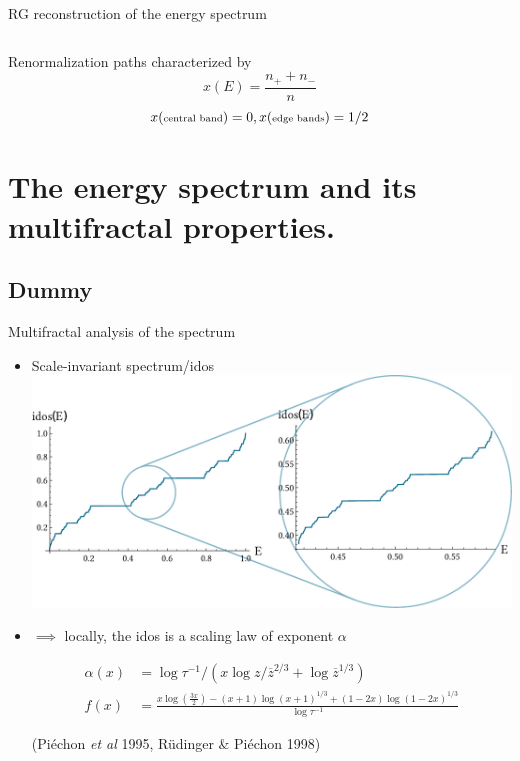\documentclass[xcolor=x11names,compress,professionalfonts]{beamer}
\renewcommand{\(}{\begin{columns}}
\renewcommand{\)}{\end{columns}}
\newcommand{\<}[1]{\begin{column}{#1}}
\renewcommand{\>}{\end{column}}
\newcommand{\zb}{\ensuremath{\overline{z}}}
\begin{document}
\begin{frame}{RG reconstruction of the energy spectrum}
\begin{columns}
\begin{column}{6cm}
	\end{column}
	\end{columns}
	Renormalization paths characterized by
	\[ 
		x(E) = \frac{n_+ + n_-}{n} 
	\]
	\[ 
		x(\text{\scriptsize{central band}}) = 0, x(\text{\scriptsize{edge bands}}) = 1/2
	\]
\end{frame}

\section{The energy spectrum and its multifractal properties.}
\subsection{Dummy}

\begin{frame}{Multifractal analysis of the spectrum}

	\begin{itemize}
		\item Scale-invariant spectrum/idos
		\includegraphics[scale=.4]{idos.pdf}
		
		\item $\implies$ locally, the idos is a scaling law of exponent $\alpha$
	
		\begin{align*}
		\alpha(x) &= \log \tau^{-1}/\left( x \log z/\zb^{2/3} + \log \zb^{1/3} \right) \\
		f(x) &= \frac{x \log \left(\frac{3 x}{2}\right)- (x+1) \log (x+1)^{1/3}+ (1-2 x) \log (1-2 x)^{1/3}}{\log \tau^{-1}}
	\end{align*}
	\begin{flushright}
	(Piéchon \emph{et al} 1995, Rüdinger \& Piéchon 1998)
	\end{flushright}
	\end{itemize}
\end{frame}
\end{document}

